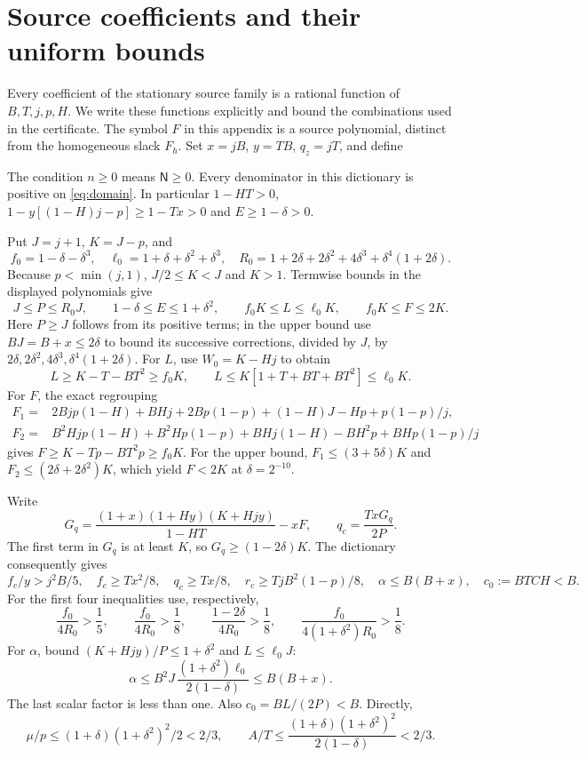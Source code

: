 \section{Source coefficients and their uniform bounds}\label{app:source}
Every coefficient of the stationary source family is a rational function
of $B,T,j,p,H$. We write these functions explicitly and bound the
combinations used in the certificate. The symbol $F$ in this appendix is a
source polynomial, distinct from the homogeneous slack $F_h$.
Set $x=jB$, $y=TB$, $q_z=jT$, and define

The condition $n\geq0$ means $\mathsf N\geq0$.
Every denominator in this dictionary is positive on \eqref{eq:domain}.
In particular $1-HT>0$,
$1-y[(1-H)j-p]\geq1-Tx>0$ and $E\geq1-\delta>0$.

Put $J=j+1$, $K=J-p$, and
\[
 f_0=1-\delta-\delta^3,\quad
 \ell_0=1+\delta+\delta^2+\delta^3,\quad
 R_0=1+2\delta+2\delta^2+4\delta^3+\delta^4(1+2\delta).
\]
Because $p<\min(j,1)$, $J/2\leq K<J$ and $K>1$.
Termwise bounds in the displayed polynomials give
\begin{equation}
 J\leq P\leq R_0J,\qquad
 1-\delta\leq E\leq1+\delta^2,\qquad
 f_0K\leq L\leq\ell_0K,\qquad f_0K\leq F\leq2K.
 \label{eq:fullsourcebounds}
\end{equation}
Here $P\geq J$ follows from its positive terms; in the upper bound use
$BJ=B+x\leq2\delta$ to bound its successive corrections, divided by $J$,
by $2\delta,2\delta^2,4\delta^3,\delta^4(1+2\delta)$.
For $L$, use $W_0=K-Hj$ to obtain
\[
 L\geq K-T-BT^2\geq f_0K,\qquad
 L\leq K[1+T+BT+BT^2]\leq\ell_0K.
\]
For $F$, the exact regrouping
\begin{align*}
 F_1={}&2Bjp(1-H)+BHj+2Bp(1-p)+(1-H)J-Hp+p(1-p)/j,\\
 F_2={}&B^2Hjp(1-H)+B^2Hp(1-p)+BHj(1-H)-BH^2p+BHp(1-p)/j
\end{align*}
gives $F\geq K-Tp-BT^2p\geq f_0K$.
For the upper bound,
$F_1\leq(3+5\delta)K$ and $F_2\leq(2\delta+2\delta^2)K$,
which yield $F<2K$ at $\delta=2^{-10}$.

Write
\[
 G_q=\frac{(1+x)(1+Hy)(K+Hjy)}{1-HT}-xF,\qquad
 q_c=\frac{TxG_q}{2P}.
\]
The first term in $G_q$ is at least $K$, so $G_q\geq(1-2\delta)K$.
The dictionary consequently gives
\begin{equation}
 f_c/y>j^2B/5,\quad
 f_c\geq Tx^2/8,\quad q_c\geq Tx/8,\quad
 r_c\geq TjB^2(1-p)/8,\quad
 \alpha\leq B(B+x),\quad c_0:=BTCH<B .
 \label{eq:positivesourcebounds}
\end{equation}
For the first four inequalities use, respectively,
\[
 \frac{f_0}{4R_0}>\frac15,\qquad
 \frac{f_0}{4R_0}>\frac18,\qquad
 \frac{1-2\delta}{4R_0}>\frac18,\qquad
 \frac{f_0}{4(1+\delta^2)R_0}>\frac18 .
\]
For $\alpha$, bound $(K+Hjy)/P\leq1+\delta^2$ and $L\leq\ell_0J$:
\[
 \alpha\leq B^2J\,\frac{(1+\delta^2)\ell_0}{2(1-\delta)}
 \leq B(B+x).
\]
The last scalar factor is less than one. Also $c_0=BL/(2P)<B$.
Directly,
\begin{equation}
 \mu/p\leq(1+\delta)(1+\delta^2)^2/2<2/3,\qquad
 A/T\leq\frac{(1+\delta)(1+\delta^2)^2}{2(1-\delta)}<2/3 .
 \label{eq:mubounds}
\end{equation}


